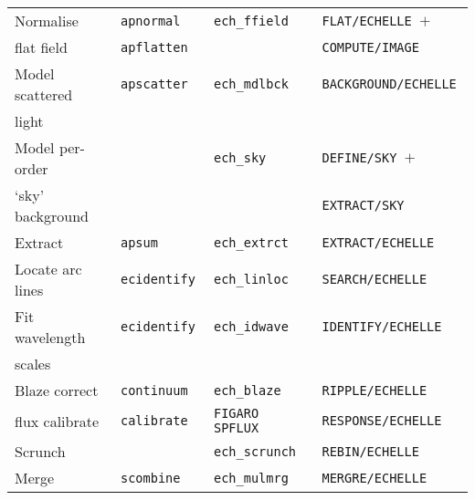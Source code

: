 \begin{latexonly}
\begin{table}
\begin{center}
\begin{tabular}{llll}
Normalise          & {\tt apnormal        } & {\tt ech\_ffield   } & {\tt FLAT/ECHELLE $+$   } \\
flat field         & {\tt apflatten       } &                      & {\tt COMPUTE/IMAGE      } \\
Model scattered    & {\tt apscatter       } & {\tt ech\_mdlbck   } & {\tt BACKGROUND/ECHELLE } \\
light              &                        &                      &                           \\
Model per-order    &                        & {\tt ech\_sky      } & {\tt DEFINE/SKY $+$     } \\
`sky' background   &                        &                      & {\tt EXTRACT/SKY        } \\
Extract            & {\tt apsum           } & {\tt ech\_extrct   } & {\tt EXTRACT/ECHELLE    } \\
Locate arc lines   & {\tt ecidentify      } & {\tt ech\_linloc   } & {\tt SEARCH/ECHELLE     } \\
Fit wavelength     & {\tt ecidentify      } & {\tt ech\_idwave   } & {\tt IDENTIFY/ECHELLE   } \\
scales             &                        &                      &                           \\
Blaze correct      & {\tt continuum       } & {\tt ech\_blaze    } & {\tt RIPPLE/ECHELLE     } \\
flux calibrate     & {\tt calibrate       } & {\tt FIGARO SPFLUX } & {\tt RESPONSE/ECHELLE   } \\
Scrunch            &                        & {\tt ech\_scrunch  } & {\tt REBIN/ECHELLE      } \\
Merge              & {\tt scombine        } & {\tt ech\_mulmrg   } & {\tt MERGRE/ECHELLE     } \\
\hline\hline
\end{tabular}
\end{center}
\end{table}
\end{latexonly}
